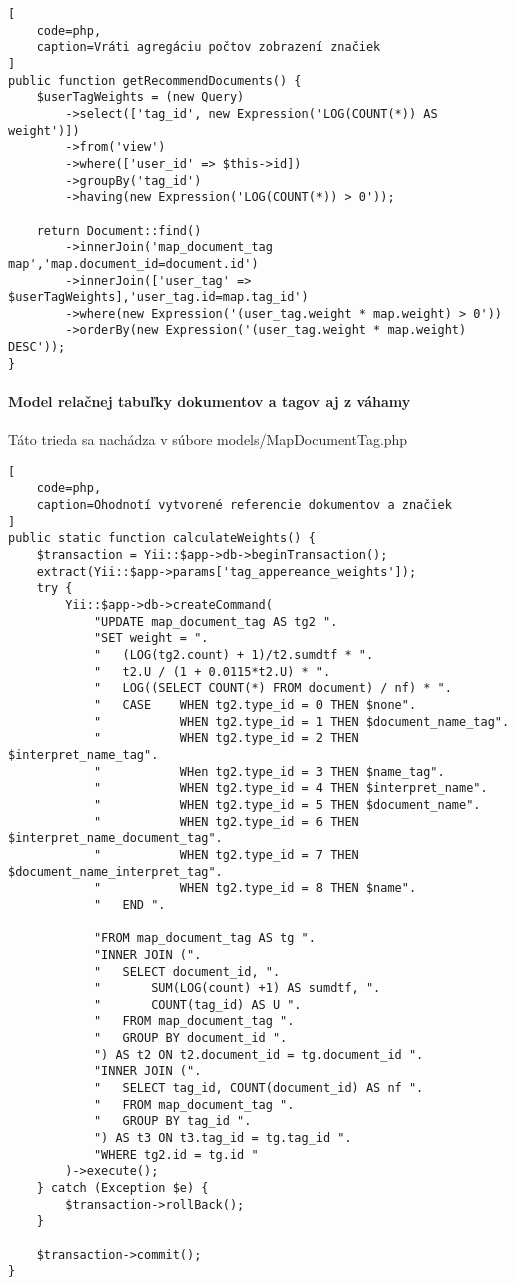 \begin{lstlisting}[
    code=php,
    caption=Vráti agregáciu počtov zobrazení značiek
]
public function getRecommendDocuments() {
    $userTagWeights = (new Query)
        ->select(['tag_id', new Expression('LOG(COUNT(*)) AS weight')])
        ->from('view')
        ->where(['user_id' => $this->id])
        ->groupBy('tag_id')
        ->having(new Expression('LOG(COUNT(*)) > 0'));

    return Document::find()
        ->innerJoin('map_document_tag map','map.document_id=document.id')
        ->innerJoin(['user_tag' => $userTagWeights],'user_tag.id=map.tag_id')
        ->where(new Expression('(user_tag.weight * map.weight) > 0'))
        ->orderBy(new Expression('(user_tag.weight * map.weight) DESC'));
}
\end{lstlisting}

\paragraph{Model relačnej tabuľky dokumentov a tagov aj z váhamy}

Táto trieda sa nachádza v súbore models/MapDocumentTag.php

\begin{lstlisting}[
    code=php,
    caption=Ohodnotí vytvorené referencie dokumentov a značiek
]
public static function calculateWeights() {
    $transaction = Yii::$app->db->beginTransaction();
    extract(Yii::$app->params['tag_appereance_weights']);
    try {
        Yii::$app->db->createCommand(
            "UPDATE map_document_tag AS tg2 ".
            "SET weight = ".
            "   (LOG(tg2.count) + 1)/t2.sumdtf * ".
            "   t2.U / (1 + 0.0115*t2.U) * ".
            "   LOG((SELECT COUNT(*) FROM document) / nf) * ".
            "   CASE    WHEN tg2.type_id = 0 THEN $none".
            "           WHEN tg2.type_id = 1 THEN $document_name_tag".
            "           WHEN tg2.type_id = 2 THEN $interpret_name_tag".
            "           WHen tg2.type_id = 3 THEN $name_tag".
            "           WHEN tg2.type_id = 4 THEN $interpret_name".
            "           WHEN tg2.type_id = 5 THEN $document_name".
            "           WHEN tg2.type_id = 6 THEN $interpret_name_document_tag".
            "           WHEN tg2.type_id = 7 THEN $document_name_interpret_tag".
            "           WHEN tg2.type_id = 8 THEN $name".
            "   END ".

            "FROM map_document_tag AS tg ".
            "INNER JOIN (".
            "   SELECT document_id, ".
            "       SUM(LOG(count) +1) AS sumdtf, ".
            "       COUNT(tag_id) AS U ".
            "   FROM map_document_tag ".
            "   GROUP BY document_id ".
            ") AS t2 ON t2.document_id = tg.document_id ".
            "INNER JOIN (".
            "   SELECT tag_id, COUNT(document_id) AS nf ".
            "   FROM map_document_tag ".
            "   GROUP BY tag_id ".
            ") AS t3 ON t3.tag_id = tg.tag_id ".
            "WHERE tg2.id = tg.id "
        )->execute();
    } catch (Exception $e) {
        $transaction->rollBack();
    }

    $transaction->commit();
}
\end{lstlisting}

